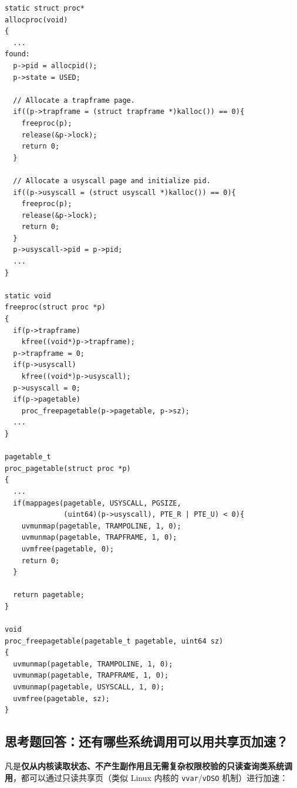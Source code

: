 \documentclass[12pt, a4paper]{ctexart}
\begin{document}
\begin{lstlisting}[caption={\texttt{kernel/proc.c} 中 \texttt{usyscall} 生命周期管理}]
static struct proc*
allocproc(void)
{
  ...
found:
  p->pid = allocpid();
  p->state = USED;

  // Allocate a trapframe page.
  if((p->trapframe = (struct trapframe *)kalloc()) == 0){
    freeproc(p);
    release(&p->lock);
    return 0;
  }

  // Allocate a usyscall page and initialize pid.
  if((p->usyscall = (struct usyscall *)kalloc()) == 0){
    freeproc(p);
    release(&p->lock);
    return 0;
  }
  p->usyscall->pid = p->pid;
  ...
}

static void
freeproc(struct proc *p)
{
  if(p->trapframe)
    kfree((void*)p->trapframe);
  p->trapframe = 0;
  if(p->usyscall)
    kfree((void*)p->usyscall);
  p->usyscall = 0;
  if(p->pagetable)
    proc_freepagetable(p->pagetable, p->sz);
  ...
}

pagetable_t
proc_pagetable(struct proc *p)
{
  ...
  if(mappages(pagetable, USYSCALL, PGSIZE,
              (uint64)(p->usyscall), PTE_R | PTE_U) < 0){
    uvmunmap(pagetable, TRAMPOLINE, 1, 0);
    uvmunmap(pagetable, TRAPFRAME, 1, 0);
    uvmfree(pagetable, 0);
    return 0;
  }

  return pagetable;
}

void
proc_freepagetable(pagetable_t pagetable, uint64 sz)
{
  uvmunmap(pagetable, TRAMPOLINE, 1, 0);
  uvmunmap(pagetable, TRAPFRAME, 1, 0);
  uvmunmap(pagetable, USYSCALL, 1, 0);
  uvmfree(pagetable, sz);
}
\end{lstlisting}

\subsection{思考题回答：还有哪些系统调用可以用共享页加速？}
凡是\textbf{仅从内核读取状态、不产生副作用且无需复杂权限校验的只读查询类系统调用}，都可以通过只读共享页（类似 Linux 内核的 \texttt{vvar}/\texttt{vDSO} 机制）进行加速：
\end{document}
